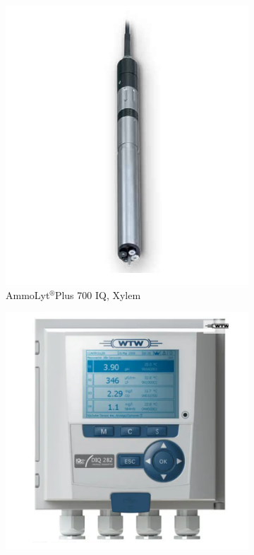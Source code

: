 \begin{figure}[h]
    \centering
    \begin{subfigure}{0.3\textwidth}
      \includegraphics[width=\linewidth]{imgs/instrument/ammonium-sensor.png}
      \caption{AmmoLyt$^\circledR$Plus 700 IQ, Xylem} \label{fig:nh3-sensor-a}
    \end{subfigure}%
    \hspace{5em}%
    \begin{subfigure}{0.3\textwidth}
      \includegraphics[width=\linewidth]{imgs/instrument/controller-for-iq-sensor.png}

\end{subfigure}
\end{figure}
